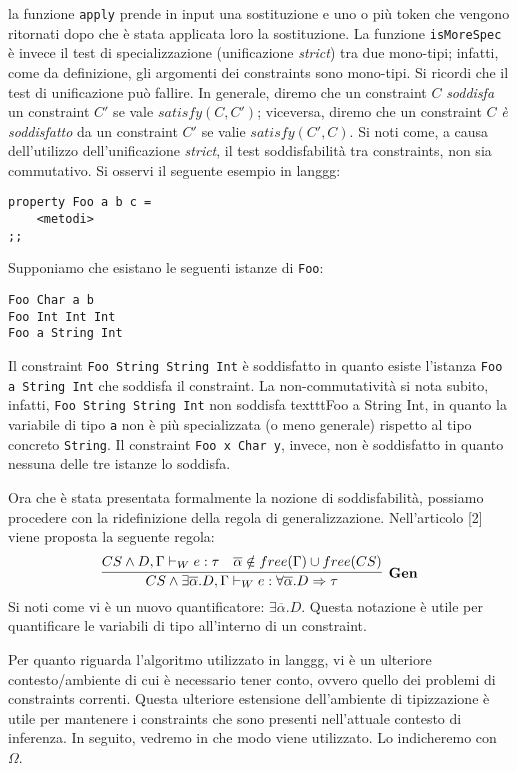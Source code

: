 \documentclass[10pt,a4paper]{article}
\begin{document}
la funzione \texttt{apply} prende in input una sostituzione e uno o più token che vengono ritornati dopo che è stata
applicata loro la sostituzione. La funzione \texttt{isMoreSpec} è invece il test di specializzazione (unificazione
\textit{strict}) tra due mono-tipi; infatti, come da definizione, gli argomenti dei constraints sono mono-tipi.
Si ricordi che il test di unificazione può fallire. In generale, diremo che un constraint $ C $ \textit{soddisfa} un
constraint $ C' $ se vale $ satisfy(C, C') $; viceversa, diremo che un constraint $ C $ \textit{è soddisfatto} da un
constraint $ C' $ se valie $ satisfy(C', C) $.
Si noti come, a causa dell'utilizzo dell'unificazione \textit{strict}, il test soddisfabilità tra constraints, non sia
commutativo. Si osservi il seguente esempio in langgg:
\begin{lstlisting}
property Foo a b c =
    <metodi>
;;
\end{lstlisting}
Supponiamo che esistano le seguenti istanze di \texttt{Foo}:
\begin{lstlisting}
Foo Char a b
Foo Int Int Int
Foo a String Int
\end{lstlisting}
Il constraint \texttt{Foo String String Int} è soddisfatto in quanto esiste l'istanza \texttt{Foo a String Int} che
soddisfa il constraint. La non-commutatività si nota subito, infatti, \texttt{Foo String String Int} non soddisfa
texttt{Foo a String Int}, in quanto la variabile di tipo \texttt{a} non è più specializzata (o meno generale) rispetto
al tipo concreto \texttt{String}. Il constraint \texttt{Foo x Char y}, invece, non è soddisfatto in quanto nessuna
delle tre istanze lo soddisfa.

Ora che è stata presentata formalmente la nozione di soddisfabilità, possiamo procedere con la ridefinizione della
regola di generalizzazione. Nell'articolo [2] viene proposta la seguente regola:
\[ \infer[\textbf{Gen}]{CS \wedge \exists \overline{\alpha}. D, \Gamma \vdash_W e : \forall \overline{\alpha}. D \Rightarrow \tau}{CS \wedge D, \Gamma \vdash_W e : \tau & \overline{\alpha} \notin free(\Gamma) \cup free(CS)} \]
Si noti come vi è un nuovo quantificatore: $ \exists \overline{\alpha}. D $. Questa notazione è utile per quantificare
le variabili di tipo all'interno di un constraint.

Per quanto riguarda l'algoritmo utilizzato in langgg, vi è un ulteriore contesto/ambiente di cui è necessario tener conto,
ovvero quello dei problemi di constraints correnti. Questa ulteriore estensione dell'ambiente di tipizzazione è utile
per mantenere i constraints che sono presenti nell'attuale contesto di inferenza. In seguito, vedremo in che modo
viene utilizzato. Lo indicheremo con $ \Omega $.
\end{document}
